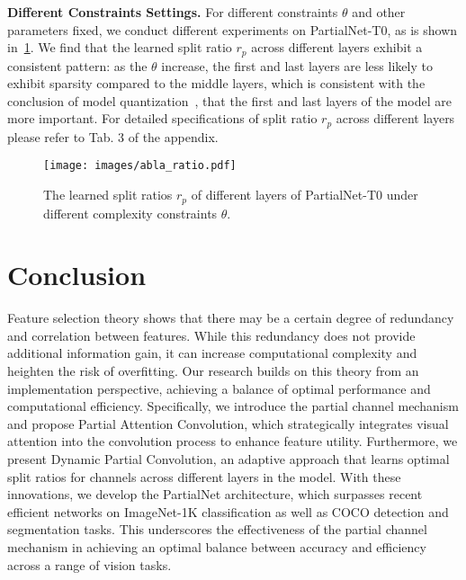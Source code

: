 \textbf{Different Constraints Settings.}
For different constraints {\small $\theta$} and other parameters fixed, we conduct different experiments on PartialNet-T0, as is shown in~\cref{fig:abla_ratio}. We find that the learned split ratio {\small $r_p$} across different layers exhibit a consistent pattern: as the {\small $\theta$} increase, the first and last layers are less likely to exhibit sparsity compared to the middle layers, which is consistent with the conclusion of model quantization~\cite{Dong2019}, that the first and last layers of the model are more important. For detailed specifications of split ratio {\small $r_p$} across different layers please refer to Tab. 3 of the appendix.

\begin{figure}[ht]
  \centering
  \texttt{[image: images/abla\_ratio.pdf]}
  \caption{The learned split ratios {\small $r_p$} of different layers of PartialNet-T0 under different complexity constraints {\small $\theta$}.}
  \label{fig:abla_ratio}
\end{figure}

\section{Conclusion}
\label{sec:conclusion}
Feature selection theory shows that there may be a certain degree of redundancy and correlation between features. While this redundancy does not provide additional information gain, it can increase computational complexity and heighten the risk of overfitting. Our research builds on this theory from an implementation perspective, achieving a balance of optimal performance and computational efficiency. Specifically, we introduce the partial channel mechanism and propose Partial Attention Convolution, which strategically integrates visual attention into the convolution process to enhance feature utility. Furthermore, we present Dynamic Partial Convolution, an adaptive approach that learns optimal split ratios for channels across different layers in the model. With these innovations, we develop the PartialNet architecture, which surpasses recent efficient networks on ImageNet-1K classification as well as COCO detection and segmentation tasks. This underscores the effectiveness of the partial channel mechanism in achieving an optimal balance between accuracy and efficiency across a range of vision tasks.
